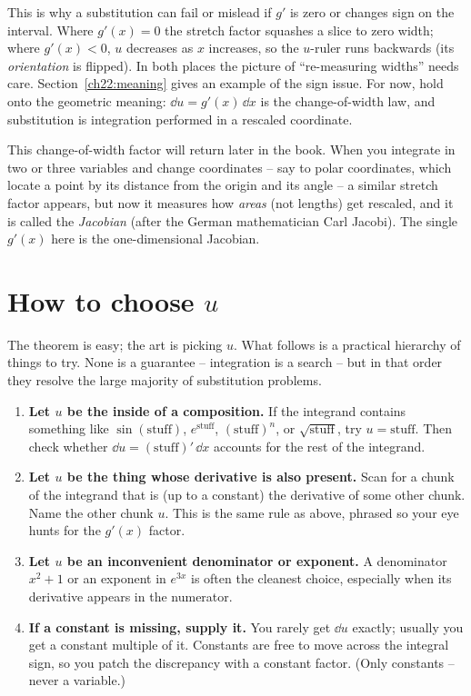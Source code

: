 This is why a substitution can fail or mislead if $g'$ is zero or changes sign on
the interval. Where $g'(x)=0$ the stretch factor squashes a slice to zero width;
where $g'(x)<0$, $u$ decreases as $x$ increases, so the $u$-ruler runs backwards
(its \emph{orientation} is flipped). In both places the picture of
``re-measuring widths'' needs care. Section~\ref{ch22:meaning}
gives an example of the sign issue. For now, hold onto the geometric meaning: $\dd u =
g'(x)\,\dd x$ is the change-of-width law, and substitution is integration performed
in a rescaled coordinate.

\begin{connectionbox}
This change-of-width factor will return later in the book. When you integrate in
two or three variables and change coordinates -- say to polar coordinates, which
locate a point by its distance from the origin and its angle -- a
similar stretch factor appears, but now it measures how \emph{areas} (not lengths)
get rescaled, and it is called the \emph{Jacobian} (after the German mathematician
Carl Jacobi). The single $g'(x)$ here is the one-dimensional Jacobian.
\end{connectionbox}

\section{How to choose $u$}
\label{ch22:choosing-u}

The theorem is easy; the art is picking $u$. What follows is a practical hierarchy
of things to try. None is a guarantee -- integration is a search -- but in that
order they resolve the large majority of substitution problems.

\begin{enumerate}
\item \textbf{Let $u$ be the inside of a composition.} If the integrand contains
something like $\sin(\text{stuff})$, $e^{\text{stuff}}$, $(\text{stuff})^{n}$, or
$\sqrt{\text{stuff}}$, try $u = \text{stuff}$. Then check whether $\dd u =
(\text{stuff})'\,\dd x$ accounts for the rest of the integrand.

\item \textbf{Let $u$ be the thing whose derivative is also present.} Scan for a
chunk of the integrand that is (up to a constant) the derivative of some other
chunk. Name the other chunk $u$. This is the same rule as above, phrased so your eye
hunts for the $g'(x)$ factor.

\item \textbf{Let $u$ be an inconvenient denominator or exponent.} A denominator
$x^2+1$ or an exponent in $e^{3x}$ is often the cleanest choice, especially when its
derivative appears in the numerator.

\item \textbf{If a constant is missing, supply it.} You rarely get $\dd u$ exactly;
usually you get a constant multiple of it. Constants are free to move across the
integral sign, so you patch the discrepancy with a constant factor. (Only constants
-- never a variable.)
\end{enumerate}

